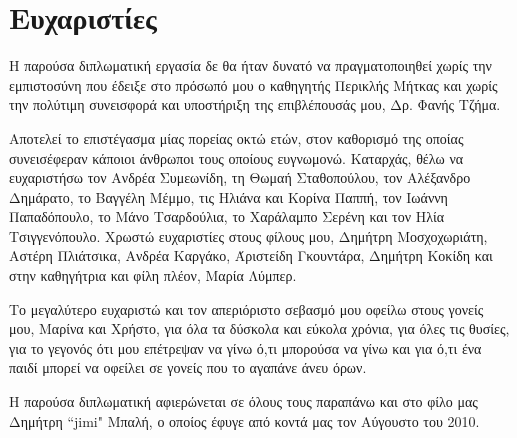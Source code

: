\section*{Ευχαριστίες}
Η παρούσα διπλωματική εργασία δε θα ήταν δυνατό να πραγματοποιηθεί χωρίς την εμπιστοσύνη που έδειξε στο πρόσωπό μου ο καθηγητής Περικλής Μήτκας και χωρίς την πολύτιμη συνεισφορά και υποστήριξη της επιβλέπουσάς μου, Δρ. Φανής Τζήμα.

Αποτελεί το επιστέγασμα μίας πορείας οκτώ ετών, στον καθορισμό της οποίας συνεισέφεραν κάποιοι άνθρωποι τους οποίους ευγνωμονώ. Καταρχάς, θέλω να ευχαριστήσω τον Ανδρέα Συμεωνίδη, τη Θωμαή Σταθοπούλου, τον Αλέξανδρο Δημάρατο, το Βαγγέλη Μέμμο, τις Ηλιάνα και Κορίνα Παππή, τον Ιωάννη Παπαδόπουλο, το Μάνο Τσαρδούλια, το Χαράλαμπο Σερένη και τον Ηλία Τσιγγενόπουλο. Χρωστώ ευχαριστίες στους φίλους μου, Δημήτρη Μοσχοχωριάτη, Αστέρη Πλιάτσικα, Ανδρέα Καργάκο, Άριστείδη Γκουντάρα, Δημήτρη Κοκίδη και στην καθηγήτρια και φίλη πλέον, Μαρία Λύμπερ.

Το μεγαλύτερο ευχαριστώ και τον απεριόριστο σεβασμό μου οφείλω στους γονείς μου, Μαρίνα και Χρήστο, για όλα τα δύσκολα και εύκολα χρόνια, για όλες τις θυσίες, για το γεγονός ότι μου επέτρεψαν να γίνω ό,τι μπορούσα να γίνω και για ό,τι ένα παιδί μπορεί να οφείλει σε γονείς που το αγαπάνε άνευ όρων.

Η παρούσα διπλωματική αφιερώνεται σε όλους τους παραπάνω και στο φίλο μας Δημήτρη “jimi" Μπαλή, ο οποίος έφυγε από κοντά μας τον Αύγουστο του 2010.




